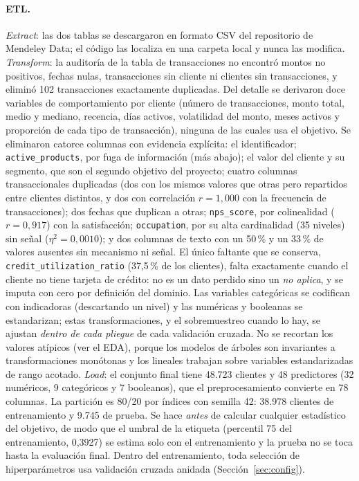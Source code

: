 \documentclass[pdflatex,sn-mathphys-num]{sn-jnl}
\newcommand{\ap}{\texttt{active\_products}}
\begin{document}
\paragraph{ETL.}
\emph{Extract}: las dos tablas se descargaron en formato CSV del repositorio de Mendeley Data; el código las localiza en una carpeta local y nunca las modifica. \emph{Transform}: la auditoría de la tabla de transacciones no encontró montos no positivos, fechas nulas, transacciones sin cliente ni clientes sin transacciones, y eliminó 102 transacciones exactamente duplicadas. Del detalle se derivaron doce variables de comportamiento por cliente (número de transacciones, monto total, medio y mediano, recencia, días activos, volatilidad del monto, meses activos y proporción de cada tipo de transacción), ninguna de las cuales usa el objetivo. Se eliminaron catorce columnas con evidencia explícita: el identificador; \ap, por fuga de información (más abajo); el valor del cliente y su segmento, que son el segundo objetivo del proyecto; cuatro columnas transaccionales duplicadas (dos con los mismos valores que otras pero repartidos entre clientes distintos, y dos con correlación $r=1{,}000$ con la frecuencia de transacciones); dos fechas que duplican a otras; \texttt{nps\_score}, por colinealidad ($r=0{,}917$) con la satisfacción; \texttt{occupation}, por su alta cardinalidad (35 niveles) sin señal ($\eta^2=0{,}0010$); y dos columnas de texto con un 50\,\% y un 33\,\% de valores ausentes sin mecanismo ni señal. El único faltante que se conserva, \texttt{credit\_utilization\_ratio} (37,5\,\% de los clientes), falta exactamente cuando el cliente no tiene tarjeta de crédito: no es un dato perdido sino un \emph{no aplica}, y se imputa con cero por definición del dominio. Las variables categóricas se codifican con indicadoras (descartando un nivel) y las numéricas y booleanas se estandarizan; estas transformaciones, y el sobremuestreo cuando lo hay, se ajustan \emph{dentro de cada pliegue} de cada validación cruzada. No se recortan los valores atípicos (ver el EDA), porque los modelos de árboles son invariantes a transformaciones monótonas y los lineales trabajan sobre variables estandarizadas de rango acotado. \emph{Load}: el conjunto final tiene 48.723 clientes y 48 predictores (32 numéricos, 9 categóricos y 7 booleanos), que el preprocesamiento convierte en 78 columnas. La partición es 80/20 por índices con semilla 42: 38.978 clientes de entrenamiento y 9.745 de prueba. Se hace \emph{antes} de calcular cualquier estadístico del objetivo, de modo que el umbral de la etiqueta (percentil 75 del entrenamiento, 0,3927) se estima solo con el entrenamiento y la prueba no se toca hasta la evaluación final. Dentro del entrenamiento, toda selección de hiperparámetros usa validación cruzada anidada (Sección~\ref{sec:config}).
\end{document}
